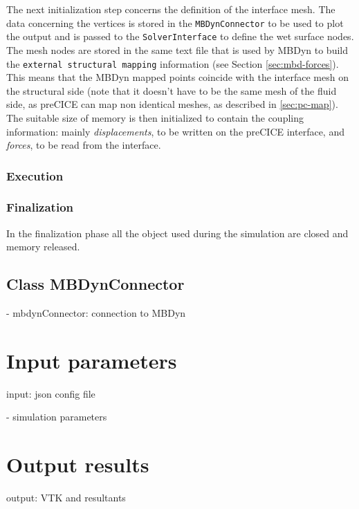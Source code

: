 The next initialization step concerns the definition of the interface mesh. The data concerning the vertices is stored in the \texttt{MBDynConnector} to be used to plot the output and is passed to the \texttt{SolverInterface} to define the wet surface nodes. The mesh nodes are stored in the same text file that is used by MBDyn to build the \texttt{external structural mapping} information (see Section \ref{sec:mbd-forces}). This means that the MBDyn mapped points coincide with the interface mesh on the structural side (note that it doesn't have to be the same mesh of the fluid side, as preCICE can map non identical meshes, as described in \ref{sec:pc-map}). The suitable size of memory is then initialized to contain the coupling information: mainly \textit{displacements}, to be written on the preCICE interface, and \textit{forces}, to be read from the interface.


\subsubsection{Execution}




\subsubsection{Finalization}

In the finalization phase all the object used during the simulation are closed and memory released.



\subsection{Class MBDynConnector}
\label{sec:mbdyn-connector.h}

- mbdynConnector: connection to MBDyn



\section{Input parameters}
\label{sec:mbdyn-adapter-input}

input: json config file

- simulation parameters

\section{Output results}

output: VTK and resultants

